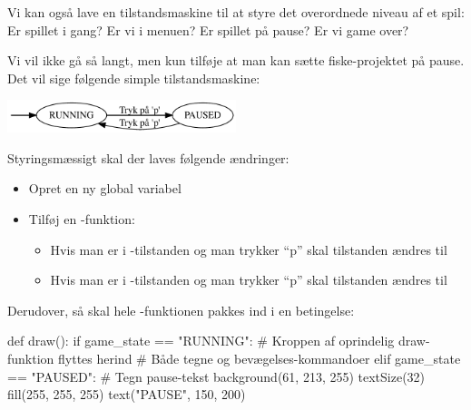 \documentclass{ucph-handout}
\begin{document}
\newpage
\begin{exercisebox}[adjusted title=Sæt på pause]
Vi kan også lave en tilstandsmaskine til at styre det overordnede
niveau af et spil: Er spillet i gang? Er vi i menuen? Er spillet på
pause? Er vi game over?

Vi vil ikke gå så langt, men kun tilføje at man kan sætte
fiske-projektet på pause. Det vil sige følgende simple tilstandsmaskine:
\begin{center}
\includegraphics[width=0.5\textwidth]{../illustrations/graphviz/pause}
\end{center}

\noindent
Styringsmæssigt skal der laves følgende ændringer:
\begin{itemize}
\item Opret en ny global variabel 
\item Tilføj en -funktion:
  \begin{itemize}
  \item Hvis man er i -tilstanden og man trykker
    ``p'' skal tilstanden ændres til 
  \item Hvis man er i -tilstanden og man trykker ``p''
    skal tilstanden ændres til 
\end{itemize}
\end{itemize}

\noindent
Derudover, så skal hele -funktionen pakkes ind i en betingelse:
\begin{python}
def draw():
    if game_state == "RUNNING":
        # Kroppen af oprindelig draw-funktion flyttes herind
        # Både tegne og bevægelses-kommandoer
    elif game_state == "PAUSED":
        # Tegn pause-tekst
        background(61, 213, 255)
        textSize(32)
        fill(255, 255, 255)
        text("PAUSE", 150, 200)
\end{python}


\end{exercisebox}
\end{document}
